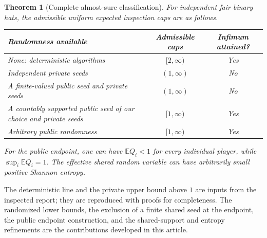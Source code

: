\documentclass[11pt,letterpaper]{article}
\newtheorem{theorem}{Theorem}[section]
\theoremstyle{definition}
\newcommand{\E}{\mathbb E}
\begin{document}
\begin{theorem}[Complete almost-sure classification]
\label{mbg:rnd:thm:frontier}
For independent fair binary hats, the admissible uniform expected
inspection caps are as follows.
\begin{center}
\normalfont
\begin{tabularx}{\textwidth}{@{}Xcc@{}}
\toprule
Randomness available & Admissible caps & Infimum attained?\\
\midrule
None: deterministic algorithms & $[2,\infty)$ & Yes\\
Independent private seeds & $(1,\infty)$ & No\\
A finite-valued public seed and private seeds & $(1,\infty)$ & No\\
A countably supported public seed of our choice and private seeds
& $[1,\infty)$ & Yes\\
Arbitrary public randomness & $[1,\infty)$ & Yes\\
\bottomrule
\end{tabularx}
\end{center}
For the public endpoint, one can have $\E Q_i<1$ for every individual
player, while $\sup_i\E Q_i=1$. The effective shared random variable can
have arbitrarily small positive Shannon entropy.
\end{theorem}

The deterministic line and the private upper bound above $1$ are inputs
from the inspected report; they are reproduced with proofs for
completeness. The randomized lower bounds, the exclusion of a finite
shared seed at the endpoint, the public endpoint construction, and the
shared-support and entropy refinements are the contributions developed
in this article.
\end{document}
